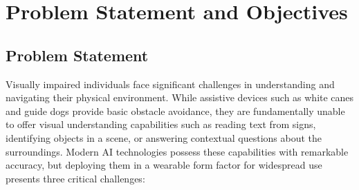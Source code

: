 \chapter{Problem Statement and Objectives}

\section{Problem Statement}
Visually impaired individuals face significant challenges in understanding and navigating their physical environment. While assistive devices such as white canes and guide dogs provide basic obstacle avoidance, they are fundamentally unable to offer visual understanding capabilities such as reading text from signs, identifying objects in a scene, or answering contextual questions about the surroundings. Modern AI technologies possess these capabilities with remarkable accuracy, but deploying them in a wearable form factor for widespread use presents three critical challenges:


